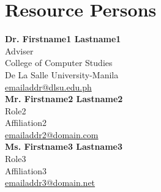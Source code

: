 %
%
%                 

\chapter{Resource Persons}
\label{sec:appendixc}

%
%
%
%

%
%
\newcommand{\resperson}[4]{\textbf{#1} \\ #2 \\ #3 \\ \url{#4}\vspace{0.5em}\\}

\resperson{Dr. Firstname1 Lastname1}{Adviser}{College of Computer Studies\\De La Salle University-Manila}{emailaddr@dlsu.edu.ph}
\resperson{Mr. Firstname2 Lastname2}{Role2}{Affiliation2}{emailaddr2@domain.com}
\resperson{Ms. Firstname3 Lastname3}{Role3}{Affiliation3}{emailaddr3@domain.net}

